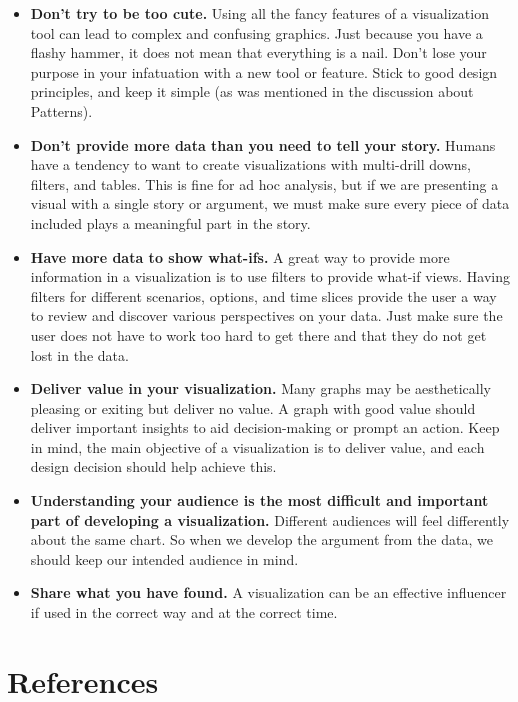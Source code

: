 \documentclass[]{book}
\theoremstyle{definition}
\theoremstyle{definition}
\theoremstyle{definition}
\theoremstyle{remark}
\begin{document}
\begin{itemize}
\item
  \textbf{Don't try to be too cute.} Using all the fancy features of a
  visualization tool can lead to complex and confusing graphics. Just
  because you have a flashy hammer, it does not mean that everything is
  a nail. Don't lose your purpose in your infatuation with a new tool or
  feature. Stick to good design principles, and keep it simple (as was
  mentioned in the discussion about Patterns).
\item
  \textbf{Don't provide more data than you need to tell your story.}
  Humans have a tendency to want to create visualizations with
  multi-drill downs, filters, and tables. This is fine for ad hoc
  analysis, but if we are presenting a visual with a single story or
  argument, we must make sure every piece of data included plays a
  meaningful part in the story.
\item
  \textbf{Have more data to show what-ifs.} A great way to provide more
  information in a visualization is to use filters to provide what-if
  views. Having filters for different scenarios, options, and time
  slices provide the user a way to review and discover various
  perspectives on your data. Just make sure the user does not have to
  work too hard to get there and that they do not get lost in the data.
\item
  \textbf{Deliver value in your visualization.} Many graphs may be
  aesthetically pleasing or exiting but deliver no value. A graph with
  good value should deliver important insights to aid decision-making or
  prompt an action. Keep in mind, the main objective of a visualization
  is to deliver value, and each design decision should help achieve
  this.
\item
  \textbf{Understanding your audience is the most difficult and
  important part of developing a visualization.} Different audiences
  will feel differently about the same chart. So when we develop the
  argument from the data, we should keep our intended audience in mind.
\item
  \textbf{Share what you have found.} A visualization can be an
  effective influencer if used in the correct way and at the correct
  time.
\end{itemize}

\chapter*{References}\label{references-1}
\end{document}
